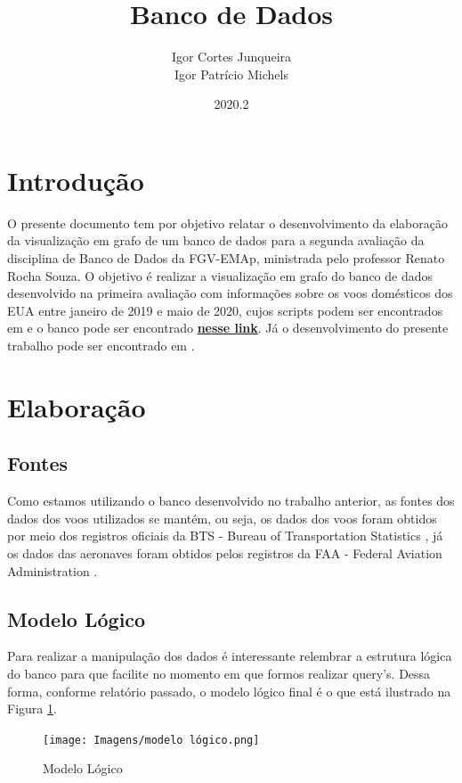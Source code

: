 \documentclass{article}
\title{Banco de Dados}
\author{Igor Cortes Junqueira \\ Igor Patrício Michels}
\date{2020.2}
\begin{document}
\maketitle

\section{Introdução}

O presente documento tem por objetivo relatar o desenvolvimento da elaboração da visualização em grafo de um banco de dados para a segunda avaliação da disciplina de Banco de Dados da FGV-EMAp, ministrada pelo professor Renato Rocha Souza. O objetivo é realizar a visualização em grafo do banco de dados desenvolvido na primeira avaliação com informações sobre os voos domésticos dos EUA entre janeiro de 2019 e maio de 2020, cujos scripts podem ser encontrados em \cite{github} e o banco pode ser encontrado \href{https://gvmail-my.sharepoint.com/:f:/g/personal/b39254_fgv_edu_br/Ev8i0xwOqnFFh_q3gTqvNAkBhzL_dpV6_ljzh82vJsTnNg?e=7ubrsl}{\textbf{nesse link}}. Já o desenvolvimento do presente trabalho pode ser encontrado em \cite{github2}.

\section{Elaboração}

\subsection{Fontes}

Como estamos utilizando o banco desenvolvido no trabalho anterior, as fontes dos dados dos voos utilizados se mantém, ou seja, os dados dos voos foram obtidos por meio dos registros oficiais da BTS - Bureau of Transportation Statistics \cite{BTS}, já os dados das aeronaves foram obtidos pelos registros da FAA - Federal Aviation Administration \cite{FAA}.

\subsection{Modelo Lógico}

Para realizar a manipulação dos dados é interessante relembrar a estrutura lógica do banco para que facilite no momento em que formos realizar query's. Dessa forma, conforme relatório passado, o modelo lógico final é o que está ilustrado na Figura \ref{lógico}.
\begin{figure}
    \centering
    \texttt{[image: Imagens/modelo lógico.png]}
    \caption{Modelo Lógico}
    \label{lógico}
\end{figure}
\end{document}
